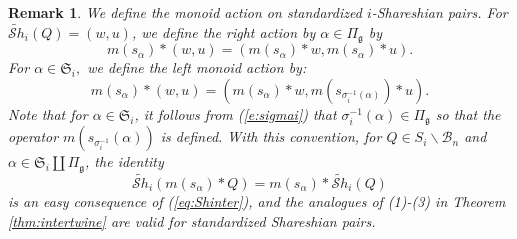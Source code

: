 \documentclass[12pt]{amsart}
\numberwithin{equation}{section}
\newtheorem{rem}[thm]{Remark}
\newcommand{\fg}{\mbox{${\mathfrak g}$}}
\newcommand{\B}{\mathcal{B}}
\newcommand{\ms}{m(s_{\alpha})}
\newcommand{\Sh}{\mathcal{S}h}
\begin{document}
 \begin{rem}\label{r:standardmonoid}
We define the monoid action on standardized $i$-Shareshian pairs.  For $\widetilde{\Sh}_{i}(Q)=(w,u)$, we define the right action by $\alpha\in \Pi_{\fg}$  by 
$$
\ms*(w,u)=(\ms*w, \ms*u).  
$$
For $\alpha\in \mathfrak{S}_{i},$ we define the left monoid action by:  
\begin{equation}\label{eq:twistinsecond}
 \ms*(w,u)=(\ms*w, m(s_{\sigma_{i}^{-1}(\alpha)})* u).
\end{equation}
 Note that for $\alpha\in\mathfrak{S}_{i}$, it follows from (\ref{e:sigmai}) that $\sigma_{i}^{-1}(\alpha)\in \Pi_{\fg}$ so that the operator $m(s_{\sigma_{i}^{-1}}(\alpha))$ is defined.
With this convention, for $Q\in S_{i}\backslash\B_{n}$ and $\alpha\in\mathfrak{S}_i\coprod \Pi_{\fg}$, the identity
\begin{equation}\label{eq:standardshar}
 \widetilde{\Sh}_{i}(m(s_{\alpha})*Q)=m(s_{\alpha})*\widetilde{\Sh}_{i}(Q) 
\end{equation}
is an easy consequence of (\ref{eq:Shinter}), and the analogues of (1)-(3) in Theorem \ref{thm:intertwine} are valid for standardized Shareshian pairs.
\end{rem}


 
 
\end{document}
